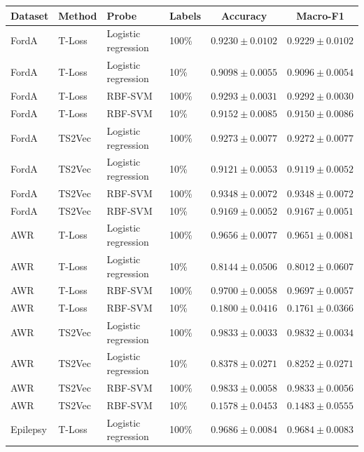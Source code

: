 \documentclass[a4paper,11pt]{article}
\begin{document}
\begin{table}[htbp]
    \centering
    \small
    \begin{tabular}{l l l l c c}
        \toprule
        Dataset & Method & Probe & Labels & Accuracy & Macro-F1 \\
        \midrule
        FordA & T-Loss & Logistic regression & 100\% & $0.9230 \pm 0.0102$ & $0.9229 \pm 0.0102$ \\
        FordA & T-Loss & Logistic regression & 10\%  & $0.9098 \pm 0.0055$ & $0.9096 \pm 0.0054$ \\
        FordA & T-Loss & RBF-SVM             & 100\% & $0.9293 \pm 0.0031$ & $0.9292 \pm 0.0030$ \\
        FordA & T-Loss & RBF-SVM             & 10\%  & $0.9152 \pm 0.0085$ & $0.9150 \pm 0.0086$ \\
        FordA & TS2Vec & Logistic regression & 100\% & $0.9273 \pm 0.0077$ & $0.9272 \pm 0.0077$ \\
        FordA & TS2Vec & Logistic regression & 10\%  & $0.9121 \pm 0.0053$ & $0.9119 \pm 0.0052$ \\
        FordA & TS2Vec & RBF-SVM             & 100\% & $0.9348 \pm 0.0072$ & $0.9348 \pm 0.0072$ \\
        FordA & TS2Vec & RBF-SVM             & 10\%  & $0.9169 \pm 0.0052$ & $0.9167 \pm 0.0051$ \\
        \midrule
        AWR & T-Loss & Logistic regression & 100\% & $0.9656 \pm 0.0077$ & $0.9651 \pm 0.0081$ \\
        AWR & T-Loss & Logistic regression & 10\%  & $0.8144 \pm 0.0506$ & $0.8012 \pm 0.0607$ \\
        AWR & T-Loss & RBF-SVM             & 100\% & $0.9700 \pm 0.0058$ & $0.9697 \pm 0.0057$ \\
        AWR & T-Loss & RBF-SVM             & 10\%  & $0.1800 \pm 0.0416$ & $0.1761 \pm 0.0366$ \\
        AWR & TS2Vec & Logistic regression & 100\% & $0.9833 \pm 0.0033$ & $0.9832 \pm 0.0034$ \\
        AWR & TS2Vec & Logistic regression & 10\%  & $0.8378 \pm 0.0271$ & $0.8252 \pm 0.0271$ \\
        AWR & TS2Vec & RBF-SVM             & 100\% & $0.9833 \pm 0.0058$ & $0.9833 \pm 0.0056$ \\
        AWR & TS2Vec & RBF-SVM             & 10\%  & $0.1578 \pm 0.0453$ & $0.1483 \pm 0.0555$ \\
        \midrule
        Epilepsy & T-Loss & Logistic regression & 100\% & $0.9686 \pm 0.0084$ & $0.9684 \pm 0.0083$ \\

\end{tabular}
\end{table}
\end{document}
